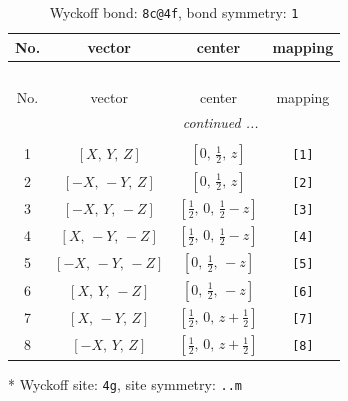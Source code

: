 \documentclass[fleqn,8pt]{jsarticle}
\begin{document}
\renewcommand{\arraystretch}{1.2}
\begin{longtable}{cccc}
\caption{Wyckoff bond: {\tt 8c@4f}, bond symmetry: {\tt 1}}
 \\
 \hline \hline
No. & vector & center & mapping \\ \hline \endfirsthead

\multicolumn{3}{l}{\tablename\ \thetable{}} \\
 \hline \hline
No. & vector & center & mapping \\ \hline \endhead

 \hline \hline
\multicolumn{3}{r}{\footnotesize\it continued ...} \\ \endfoot

 \hline \hline
\multicolumn{3}{r}{} \\ \endlastfoot

1 & $\left[ X,\, Y,\, Z \right]$ & $\left[ 0,\, \frac{1}{2},\, z \right]$ & {\tt [1]} \\ \hline
2 & $\left[ - X,\, - Y,\, Z \right]$ & $\left[ 0,\, \frac{1}{2},\, z \right]$ & {\tt [2]} \\ \hline
3 & $\left[ - X,\, Y,\, - Z \right]$ & $\left[ \frac{1}{2},\, 0,\, \frac{1}{2} - z \right]$ & {\tt [3]} \\ \hline
4 & $\left[ X,\, - Y,\, - Z \right]$ & $\left[ \frac{1}{2},\, 0,\, \frac{1}{2} - z \right]$ & {\tt [4]} \\ \hline
5 & $\left[ - X,\, - Y,\, - Z \right]$ & $\left[ 0,\, \frac{1}{2},\, - z \right]$ & {\tt [5]} \\ \hline
6 & $\left[ X,\, Y,\, - Z \right]$ & $\left[ 0,\, \frac{1}{2},\, - z \right]$ & {\tt [6]} \\ \hline
7 & $\left[ X,\, - Y,\, Z \right]$ & $\left[ \frac{1}{2},\, 0,\, z + \frac{1}{2} \right]$ & {\tt [7]} \\ \hline
8 & $\left[ - X,\, Y,\, Z \right]$ & $\left[ \frac{1}{2},\, 0,\, z + \frac{1}{2} \right]$ & {\tt [8]} \\
\end{longtable}
* Wyckoff site: {\tt 4g}, site symmetry: {\tt ..m}
\renewcommand{\arraystretch}{1.2}
\end{document}
